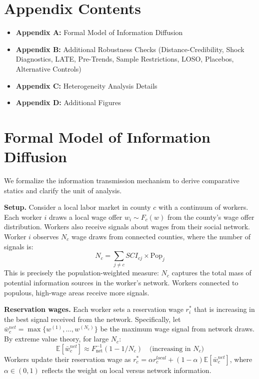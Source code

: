 \documentclass[12pt]{article}
\newcommand{\E}{\mathbb{E}}
\begin{document}
\clearpage
\appendix

\section*{Appendix Contents}
\begin{itemize}
\item \textbf{Appendix A:} Formal Model of Information Diffusion
\item \textbf{Appendix B:} Additional Robustness Checks (Distance-Credibility, Shock Diagnostics, LATE, Pre-Trends, Sample Restrictions, LOSO, Placebos, Alternative Controls)
\item \textbf{Appendix C:} Heterogeneity Analysis Details
\item \textbf{Appendix D:} Additional Figures
\end{itemize}

\section{Formal Model of Information Diffusion}
\label{sec:formal_model_appendix}

We formalize the information transmission mechanism to derive comparative statics and clarify the unit of analysis.

\textbf{Setup.} Consider a local labor market in county $c$ with a continuum of workers. Each worker $i$ draws a local wage offer $w_i \sim F_c(w)$ from the county's wage offer distribution. Workers also receive signals about wages from their social network. Worker $i$ observes $N_c$ wage draws from connected counties, where the number of signals is:
\begin{equation}
N_c = \sum_{j \neq c} SCI_{cj} \times \text{Pop}_j
\end{equation}
This is precisely the population-weighted measure: $N_c$ captures the total mass of potential information sources in the worker's network. Workers connected to populous, high-wage areas receive more signals.

\textbf{Reservation wages.} Each worker sets a reservation wage $r^*_i$ that is increasing in the best signal received from the network. Specifically, let $\bar{w}^{net}_c = \max\{w^{(1)}, \ldots, w^{(N_c)}\}$ be the maximum wage signal from network draws. By extreme value theory, for large $N_c$:
\begin{equation}
\E[\bar{w}^{net}_c] \approx F^{-1}_{\text{net}}(1 - 1/N_c) \quad \text{(increasing in } N_c\text{)}
\end{equation}
Workers update their reservation wage as $r^*_c = \alpha r^{local}_c + (1-\alpha) \E[\bar{w}^{net}_c]$, where $\alpha \in (0,1)$ reflects the weight on local versus network information.
\end{document}
